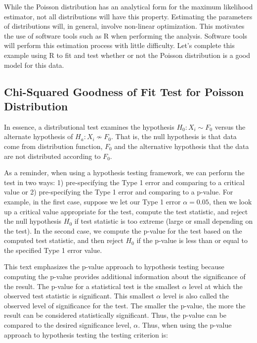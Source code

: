 \documentclass[
]{book}
\theoremstyle{definition}
\theoremstyle{definition}
\theoremstyle{definition}
\theoremstyle{definition}
\theoremstyle{remark}
\begin{document}
While the Poisson distribution has an analytical form for the maximum
likelihood estimator, not all distributions will have this property.
Estimating the parameters of distributions will, in general, involve
non-linear optimization. This motivates the use of software tools such
as R when performing the analysis. Software tools will perform this
estimation process with little difficulty. Let's complete this example
using R to fit and test whether or not the Poisson distribution is a
good model for this data.

\hypertarget{chi-squared-goodness-of-fit-test-for-poisson-distribution}{%
\subsection{Chi-Squared Goodness of Fit Test for Poisson Distribution}\label{chi-squared-goodness-of-fit-test-for-poisson-distribution}}

In essence, a distributional test examines the hypothesis
\(H_{0}: X_{i} \sim F_0\) versus the alternate hypothesis of
\(H_{a}: X_{i} \nsim F_0\). That is, the null hypothesis is that data come from distribution function, \(F_0\) and the alternative hypothesis that the data are not distributed according to \(F_0\).

As a reminder, when using a hypothesis testing framework, we can perform
the test in two ways: 1) pre-specifying the Type 1 error and comparing
to a critical value or 2) pre-specifying the Type 1 error and comparing
to a p-value. For example, in the first case, suppose we let our Type 1
error \(\alpha = 0.05\), then we look up a critical value appropriate for
the test, compute the test statistic, and reject the null hypothesis
\(H_{0}\) if test statistic is too extreme (large or small depending on
the test). In the second case, we compute the p-value for the test based
on the computed test statistic, and then reject \(H_{0}\) if the p-value
is less than or equal to the specified Type 1 error value.

This text emphasizes the p-value approach to hypothesis testing because
computing the p-value provides additional information about the
significance of the result. The p-value for a statistical test is the
smallest \(\alpha\) level at which the observed test statistic is
significant. This smallest \(\alpha\) level is also called the observed
level of significance for the test. The smaller the p-value, the more
the result can be considered statistically significant. Thus, the
p-value can be compared to the desired significance level, \(\alpha\).
Thus, when using the p-value approach to hypothesis testing the testing
criterion is:
\end{document}
